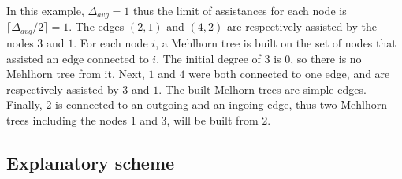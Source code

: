 \documentclass{article}
\begin{document}
In this example, $\Delta_{avg} = 1$ thus the limit of assistances
for each node is $\lceil\Delta_{avg}/2\rceil = 1$. The edges $(2,1)$
and $(4,2)$ are respectively assisted by the nodes $3$ and $1$.
For each node $i$, a Mehlhorn tree is built on the set of nodes that
assisted an edge connected to $i$.
The initial degree of $3$ is $0$, so there is no Mehlhorn tree from it.
Next, $1$ and $4$ were both connected to one edge, and are respectively
assisted by $3$ and $1$. The built Melhorn trees are simple edges.
Finally, $2$ is connected to an outgoing and an ingoing edge, thus two
Mehlhorn trees including the nodes $1$ and $3$, will be built from $2$.

\newpage

\subsection{Explanatory scheme}

\begin{figure}[!htb]\centering
  \begin{minipage}[b]{.45\linewidth}
    \begin{adjustbox}{width=\linewidth}
    \end{adjustbox}
  \end{minipage}
\end{figure}
\end{document}

